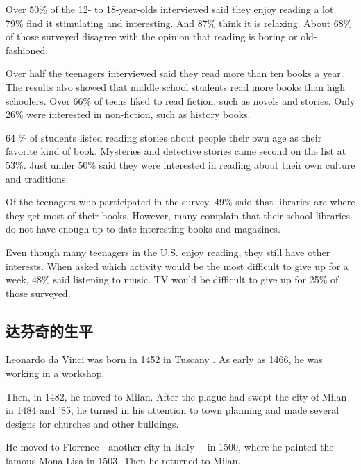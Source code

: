 Over 50\% of the 12- to 18-year-olds interviewed said they
enjoy reading a lot. 79\% find it
stimulating and interesting. And 87\% think it is relaxing.
About 68\% of those surveyed disagree with the opinion
that reading is boring or old-fashioned.

Over half the teenagers interviewed said they read more
than ten books a year. The results also showed that middle
school students read more books than high schoolers. Over 66\% of teens liked to read fiction, such as novels and
stories. Only 26\% were interested in non-fiction, such as
history books.

64 \% of students listed reading stories about
people their own age as their favorite kind of book. Mysteries
and detective stories came second on the list at 53\%.
Just under 50\% said they were interested in reading about
their own culture and traditions.

Of the teenagers who participated in the survey, 49\%
said that libraries are where they get most of their books.
However, many complain that their school libraries do not
have enough up-to-date interesting books and magazines.

Even though many teenagers in the U.S. enjoy reading,
they still have other interests. When asked which activity
would be the most difficult to give up for a week, 48\%
said listening to music. TV would be difficult to give up for
25\% of those surveyed.
\subsection{达芬奇的生平}
\begin{margintable}\vspace{-2cm}\footnotesize
\end{margintable}
Leonardo da Vinci was born in 1452 in Tuscany . As early as
1466, he was working in a workshop.

Then, in 1482, he moved to Milan. After the plague
had swept the city of Milan in 1484 and '85, he turned in
his attention to town planning and made several designs
for churches and other buildings.

He moved to Florence—another city in Italy—
in 1500, where he painted the famous Mona Lisa in 1503.
Then he returned to Milan.

